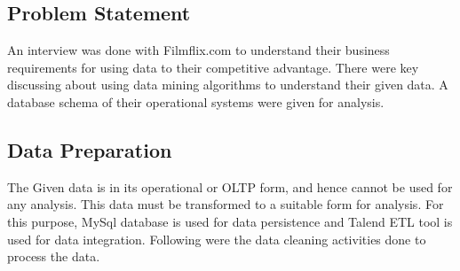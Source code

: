\documentclass{article}
\begin{document}
\subsection*{Problem Statement}
An interview was done with  Filmflix.com to understand their business requirements for using data to their competitive advantage.
There were key discussing about using data mining algorithms to understand their given data. A database schema of their operational systems were given for analysis.
\subsection{Data Preparation}
The Given data is in its operational or OLTP form, and hence cannot be used for any analysis. This data must be transformed to a suitable form for analysis. For this purpose, MySql database is used for data persistence and Talend ETL tool is used for data integration. Following were the data cleaning activities done to process the data.
\end{document}
